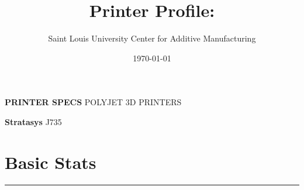 \documentclass{article}
\title{Printer Profile: }
\author{Saint Louis University Center for Additive Manufacturing}
\date{\today}
\begin{document}
\noindent
\large{\textcolor{slublue} {\textbf{PRINTER SPECS}} POLYJET 3D PRINTERS}

\noindent
\huge{\textbf{Stratasys} J735}

\vspace{12}

\normalsize

\section*{Basic Stats}

\noindent
\rule[8pt]{\textwidth}{0.5pt}\vspace{-\baselineskip}\par\noindent
\end{document}

